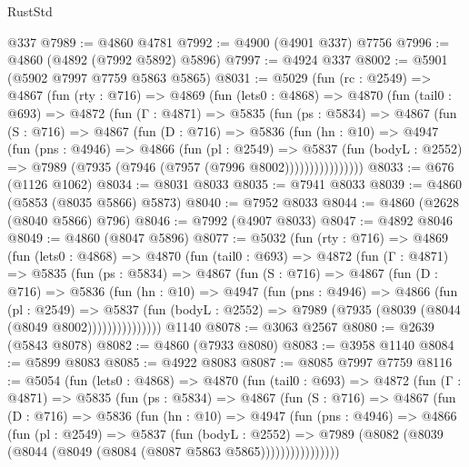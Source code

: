 \begin{lexlean}{RustStd}
\begin{coremodule}
    @337
@7989 := @4860 @4781
@7992 := @4900 (@4901 @337) @7756
@7996 := @4860 (@4892 (@7992 @5892) @5896)
@7997 := @4924 @337
@8002 := @5901 (@5902 @7997 @7759 @5863 @5865)
@8031 := @5029
    (fun (rc : @2549) =>
    @4867
      (fun (rty : @716) =>
      @4869
        (fun (lets0 : @4868) =>
        @4870
          (fun (tail0 : @693) =>
          @4872
            (fun (Γ : @4871) =>
            @5835
              (fun (ps : @5834) =>
              @4867
                (fun (S : @716) =>
                @4867
                  (fun (D : @716) =>
                  @5836
                    (fun (hn : @10) =>
                    @4947
                      (fun (pns : @4946) =>
                      @4866
                        (fun (pl : @2549) =>
                        @5837
                          (fun (bodyL : @2552) =>
                          @7989 (@7935 (@7946 (@7957 (@7996 @8002))))))))))))))))
@8033 := @676 (@1126 @1062)
@8034 := @8031 @8033
@8035 := @7941 @8033
@8039 := @4860 (@5853 (@8035 @5866) @5873)
@8040 := @7952 @8033
@8044 := @4860 (@2628 (@8040 @5866) @796)
@8046 := @7992 (@4907 @8033)
@8047 := @4892 @8046
@8049 := @4860 (@8047 @5896)
@8077 := @5032
    (fun (rty : @716) =>
    @4869
      (fun (lets0 : @4868) =>
      @4870
        (fun (tail0 : @693) =>
        @4872
          (fun (Γ : @4871) =>
          @5835
            (fun (ps : @5834) =>
            @4867
              (fun (S : @716) =>
              @4867
                (fun (D : @716) =>
                @5836
                  (fun (hn : @10) =>
                  @4947
                    (fun (pns : @4946) =>
                    @4866
                      (fun (pl : @2549) =>
                      @5837
                        (fun (bodyL : @2552) =>
                        @7989 (@7935 (@8039 (@8044 (@8049 @8002)))))))))))))))
    @1140
@8078 := @3063 @2567
@8080 := @2639 (@5843 @8078)
@8082 := @4860 (@7933 @8080)
@8083 := @3958 @1140
@8084 := @5899 @8083
@8085 := @4922 @8083
@8087 := @8085 @7997 @7759
@8116 := @5054
    (fun (lets0 : @4868) =>
    @4870
      (fun (tail0 : @693) =>
      @4872
        (fun (Γ : @4871) =>
        @5835
          (fun (ps : @5834) =>
          @4867
            (fun (S : @716) =>
            @4867
              (fun (D : @716) =>
              @5836
                (fun (hn : @10) =>
                @4947
                  (fun (pns : @4946) =>
                  @4866
                    (fun (pl : @2549) =>
                    @5837
                      (fun (bodyL : @2552) =>
                      @7989 (@8082 (@8039 (@8044 (@8049 (@8084 (@8087 @5863 @5865))))))))))))))))

\end{coremodule}
\end{lexlean}
